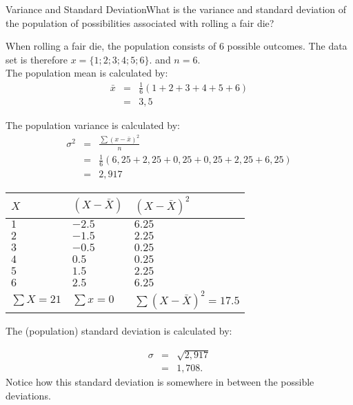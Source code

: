 \begin{wex}{Variance and Standard Deviation}{What is the variance and standard deviation of the population of possibilities associated with rolling a fair die?\\}
{
When rolling a fair die, the population consists of $6$ possible outcomes. The data set is therefore $x=\{1;2;3;4;5;6\}$. and $n=6$.\\

The population mean is calculated by:
\begin{eqnarray*}
\bar{x} &=& \frac{1}{6}(1+2+3+4+5+6)\\
&=& 3,5
\end{eqnarray*}

The population variance is calculated by:
\begin{eqnarray*}
\sigma^2&=& \frac{\sum(x-\bar{x})^2}{n}\\
&=&\frac{1}{6} (6,25+2,25+0,25+0,25+2,25+6,25)\\
&=& 2,917
\end{eqnarray*}

\begin{center}
\begin{tabular}{|l|l|l|}
\hline
$X$ & $(X - \bar{X})$ & $(X - \bar{X})^2$ \bigstrut \\
\hline
$1$ & $-2.5$ & $6.25$ \\
$2 $& $-1.5 $& $2.25 $\\
$3 $& $-0.5$ & $0.25 $\\
$4 $& $0.5$  & $0.25 $\\
$5$ & $1.5$  & $2.25 $\\
$6$ & $2.5$  & $6.25$ \\
\hline
$\sum{X} = 21$ & $\sum{x} = 0$ & $\sum{(X  - \bar{X})^2} = 17.5$ \bigstrut \\
\hline
\end{tabular}
\end{center}

The (population) standard deviation is calculated by:

\begin{eqnarray*}
\sigma &=& \sqrt{2,917} \\
&=& 1,708.
\end{eqnarray*}
Notice how this standard deviation is somewhere in between the possible deviations.}
\end{wex}

